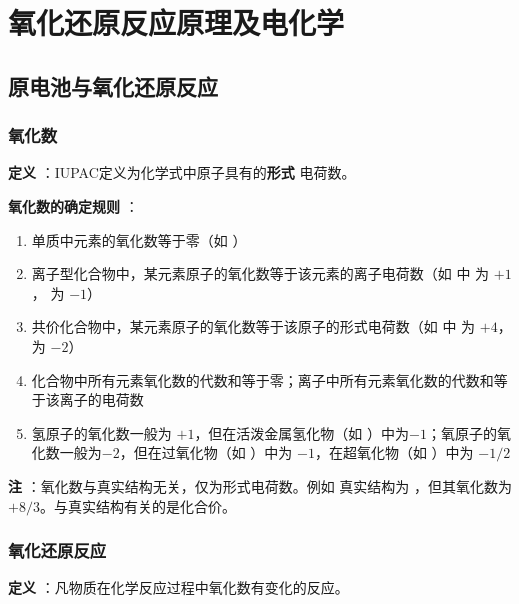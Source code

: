 \chapter{氧化还原反应原理及电化学} 

\section{原电池与氧化还原反应} 

\subsection{氧化数} 
\textbf{定义} ：IUPAC定义为化学式中原子具有的\textbf{形式} 电荷数。

\textbf{氧化数的确定规则} ：
\begin{enumerate} 
    \item 单质中元素的氧化数等于零（如   ）
    \item 离子型化合物中，某元素原子的氧化数等于该元素的离子电荷数（如    中    为 \(+ 1\)，   为 \(-1\)）
    \item 共价化合物中，某元素原子的氧化数等于该原子的形式电荷数（如    中    为 \(+ 4\)，   为 \(- 2\)）
    \item 化合物中所有元素氧化数的代数和等于零；离子中所有元素氧化数的代数和等于该离子的电荷数
    \item 氢原子的氧化数一般为 \( + 1\)，但在活泼金属氢化物（如  ）中为\(- 1\)；氧原子的氧化数一般为\(- 2\)，但在过氧化物（如  ）中为 \(- 1\)，在超氧化物（如  ）中为 \(- 1/2\)
\end{enumerate} 

\textbf{注} ：氧化数与真实结构无关，仅为形式电荷数。例如    真实结构为  ，但其氧化数为 \(+ 8/3\)。与真实结构有关的是化合价。

\subsection{氧化还原反应} 
\textbf{定义} ：凡物质在化学反应过程中氧化数有变化的反应。

